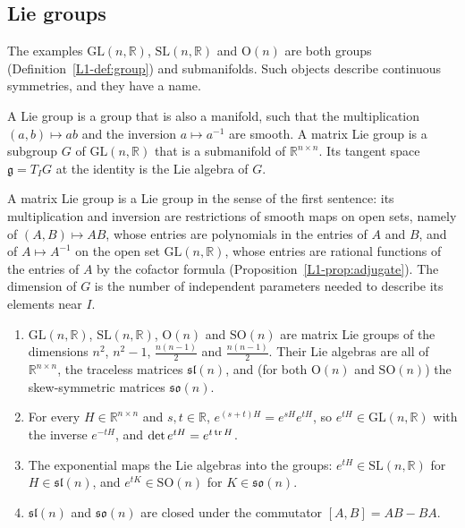 \subsection{Lie groups}\label{A-sec:lie-groups}

The examples $\mathrm{GL}(n, \mathbb{R})$, $\mathrm{SL}(n, \mathbb{R})$ and $\mathrm{O}(n)$ are both groups (Definition~\ref{L1-def:group}) and submanifolds. Such objects describe continuous symmetries, and they have a name.

\begin{definition}\label{A-def:lie-group}
    A Lie group is a group that is also a manifold, such that the multiplication $(a, b) \mapsto ab$ and the inversion $a \mapsto a^{-1}$ are smooth. A matrix Lie group is a subgroup $G$ of $\mathrm{GL}(n, \mathbb{R})$ that is a submanifold of $\mathbb{R}^{n \times n}$. Its tangent space $\mathfrak{g} = T_IG$ at the identity is the Lie algebra of $G$.
\end{definition}

A matrix Lie group is a Lie group in the sense of the first sentence: its multiplication and inversion are restrictions of smooth maps on open sets, namely of $(A, B) \mapsto AB$, whose entries are polynomials in the entries of $A$ and $B$, and of $A \mapsto A^{-1}$ on the open set $\mathrm{GL}(n, \mathbb{R})$, whose entries are rational functions of the entries of $A$ by the cofactor formula (Proposition~\ref{L1-prop:adjugate}). The dimension of $G$ is the number of independent parameters needed to describe its elements near $I$.

\begin{proposition}\label{A-prop:lie-groups}
    \begin{enumerate}
        \item $\mathrm{GL}(n, \mathbb{R})$, $\mathrm{SL}(n, \mathbb{R})$, $\mathrm{O}(n)$ and $\mathrm{SO}(n)$ are matrix Lie groups of the dimensions $n^2$, $n^2 - 1$, $\frac{n(n-1)}{2}$ and $\frac{n(n-1)}{2}$. Their Lie algebras are all of $\mathbb{R}^{n \times n}$, the traceless matrices $\mathfrak{sl}(n)$, and (for both $\mathrm{O}(n)$ and $\mathrm{SO}(n)$) the skew-symmetric matrices $\mathfrak{so}(n)$.
        \item For every $H \in \mathbb{R}^{n \times n}$ and $s, t \in \mathbb{R}$, $e^{(s+t)H} = e^{sH}e^{tH}$, so $e^{tH} \in \mathrm{GL}(n, \mathbb{R})$ with the inverse $e^{-tH}$, and $\det e^{tH} = e^{t\operatorname{tr} H}$.
        \item The exponential maps the Lie algebras into the groups: $e^{tH} \in \mathrm{SL}(n, \mathbb{R})$ for $H \in \mathfrak{sl}(n)$, and $e^{tK} \in \mathrm{SO}(n)$ for $K \in \mathfrak{so}(n)$.
        \item $\mathfrak{sl}(n)$ and $\mathfrak{so}(n)$ are closed under the commutator $[A, B] = AB - BA$.
    \end{enumerate}
\end{proposition}

